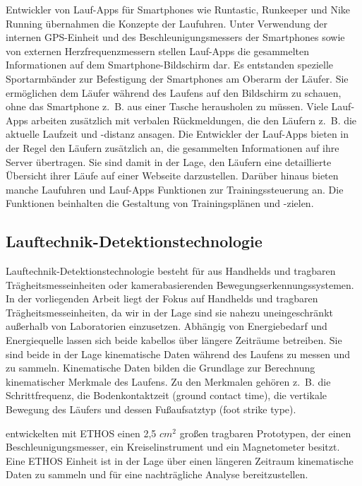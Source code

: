 Entwickler von Lauf-Apps für Smartphones wie Runtastic, Runkeeper und Nike Running übernahmen die Konzepte der Laufuhren. Unter Verwendung der internen \ac{GPS}-Einheit und des Beschleunigungsmessers der Smartphones sowie von externen Herzfrequenzmessern stellen Lauf-Apps die gesammelten Informationen auf dem Smartphone-Bildschirm dar. Es entstanden spezielle Sportarmbänder zur Befestigung der Smartphones am Oberarm der Läufer. Sie ermöglichen dem Läufer während des Laufens auf den Bildschirm zu schauen, ohne das Smartphone z.~B. aus einer Tasche herausholen zu müssen. Viele Lauf-Apps arbeiten zusätzlich mit verbalen Rückmeldungen, die den Läufern z.~B. die aktuelle Laufzeit und -distanz ansagen. Die Entwickler der Lauf-Apps bieten in der Regel den Läufern zusätzlich an, die gesammelten Informationen auf ihre Server übertragen. Sie sind damit in der Lage, den Läufern eine detaillierte Übersicht ihrer Läufe auf einer Webseite darzustellen. Darüber hinaus bieten manche Laufuhren und Lauf-Apps Funktionen zur Trainingssteuerung an. Die Funktionen beinhalten die Gestaltung von Trainingsplänen und -zielen.

\subsection{Lauftechnik-Detektionstechnologie} 

\label{sub:lauftechnik_detektionstechnologie}

Lauftechnik-Detektionstechnologie besteht für \citet{Jensen2014} aus Handhelds und tragbaren Trägheitsmesseinheiten oder kamerabasierenden Bewegungserkennungssystemen. In der vorliegenden Arbeit liegt der Fokus auf Handhelds und tragbaren Trägheitsmesseinheiten, da wir in der Lage sind sie nahezu uneingeschränkt außerhalb von Laboratorien einzusetzen. Abhängig von Energiebedarf und Energiequelle lassen sich beide kabellos über längere Zeiträume betreiben. Sie sind beide in der Lage kinematische Daten während des Laufens zu messen und zu sammeln. Kinematische Daten bilden die Grundlage zur Berechnung kinematischer Merkmale des Laufens. Zu den Merkmalen gehören z.~B. die Schrittfrequenz, die Bodenkontaktzeit (ground contact time), die vertikale Bewegung des Läufers und dessen Fußaufsatztyp (foot strike type).

\citet{Harms2010} entwickelten mit ETHOS einen 2,5 $cm^{2}$ großen tragbaren Prototypen, der einen Beschleunigungsmesser, ein Kreiselinstrument und ein Magnetometer besitzt. Eine ETHOS Einheit ist in der Lage über einen längeren Zeitraum kinematische Daten zu sammeln und für eine nachträgliche Analyse bereitzustellen.

